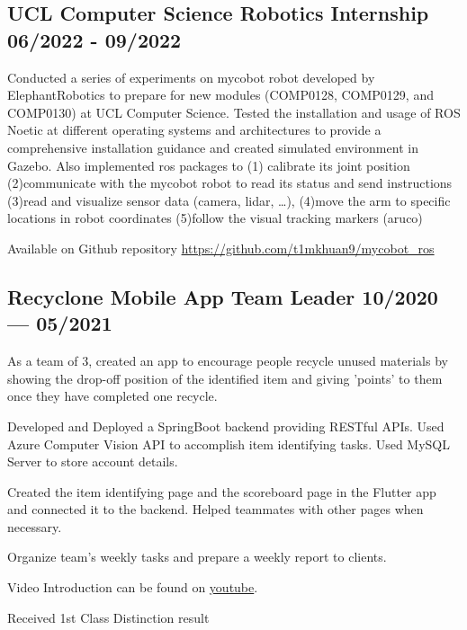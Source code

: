 \subsection*{{
    UCL Computer Science Robotics Internship
    \hfill 06/2022 - 09/2022
}}
\begin{zitemize}
    \item   Conducted a series of experiments on mycobot robot developed by ElephantRobotics 
            to prepare for new modules (COMP0128, COMP0129, and COMP0130) at UCL Computer Science. 
            Tested the installation and usage of ROS Noetic at different operating systems and architectures to provide a comprehensive installation guidance and 
            created simulated environment in Gazebo. 
            Also implemented ros packages to (1) calibrate its joint position
            (2)communicate with the mycobot robot to read its status and send instructions
            (3)read and visualize sensor data (camera, lidar, …),
            (4)move the arm to specific locations in robot coordinates
            (5)follow the visual tracking markers (aruco)
    \item   Available on Github repository 
            \url{https://github.com/t1mkhuan9/mycobot_ros}
\end{zitemize}


\subsection{{
    Recyclone Mobile App Team Leader
    \hfill 10/2020 --- 05/2021
}}
\begin{zitemize}
    \item   As a team of 3, created an app to encourage people recycle unused materials by showing
            the drop-off position of the identified item and giving 'points' to them
            once they have completed one recycle. 
    \item   Developed and Deployed a SpringBoot backend providing RESTful APIs.
            Used Azure Computer Vision API to accomplish item identifying tasks.
            Used MySQL Server to store account details. 
    \item   Created the item identifying page and the scoreboard page in the Flutter app and connected it
            to the backend. Helped teammates with other pages when necessary. 
    \item   Organize team's weekly tasks and prepare a weekly report to clients. 
    \item   Video Introduction can be found on \href{https://www.youtube.com/watch?v=gh0Uv4mf7cA&t=3s&ab_channel=timkhuang}{youtube}.
    \item   Received 1st Class Distinction result
\end{zitemize}


